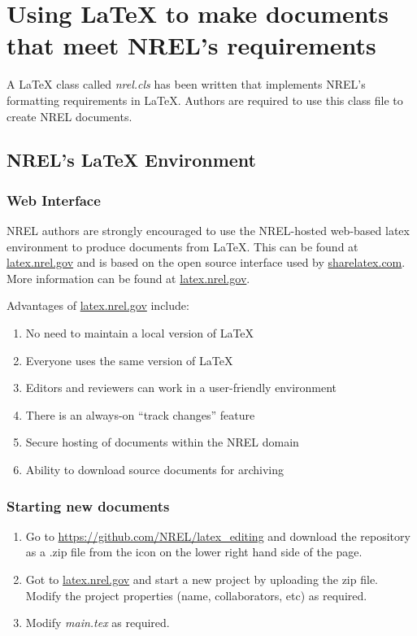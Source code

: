 \chapter{Using LaTeX to make documents that meet NREL's requirements}

A LaTeX class called \emph{nrel.cls} has been written that implements NREL's formatting requirements in LaTeX. Authors are required to use this class file to create NREL documents.

\section{NREL's LaTeX Environment}
\subsection{Web Interface}
NREL authors are strongly encouraged to use the NREL-hosted web-based latex environment to produce documents from LaTeX. This can be found at \href{latex.nrel.gov}{latex.nrel.gov} and is based on the open source interface used by \href{sharelatex.com}{sharelatex.com}. More information can be found at \href{latex.nrel.gov}{latex.nrel.gov}.

Advantages of \href{latex.nrel.gov}{latex.nrel.gov} include:
\begin{enumerate}
\item No need to maintain a local version of LaTeX
\item Everyone uses the same version of LaTeX
\item Editors and reviewers can work in a user-friendly environment
\item There is an always-on ``track changes'' feature
\item Secure hosting of documents within the NREL domain
\item Ability to download source documents for archiving
\end{enumerate}

\subsection{Starting new documents}
\begin{enumerate}
\item Go to \href{https://github.com/NREL/latex_editing}{https://github.com/NREL/latex\_editing} and download the repository as a .zip file from the icon on the lower right hand side of the page.
\item Got to \href{latex.nrel.gov}{latex.nrel.gov} and start a new project by uploading the zip file. Modify the project properties (name, collaborators, etc) as required.
\item Modify \emph{main.tex} as required.
\end{enumerate}

